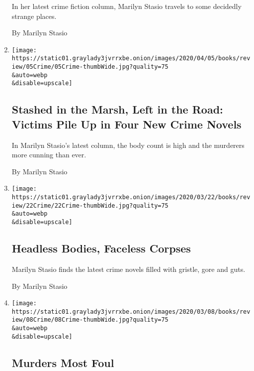 \begin{enumerate}
  In her latest crime fiction column, Marilyn Stasio travels to some
  decidedly strange places.

  By Marilyn Stasio
\item
  \href{/2020/04/03/books/review/crime-fiction-peter-swanson-eight-perfect-murders.html}{}

  \texttt{[image: https://static01.graylady3jvrrxbe.onion/images/2020/04/05/books/review/05Crime/05Crime-thumbWide.jpg?quality=75\\\&auto=webp\\\&disable=upscale]}

  \hypertarget{stashed-in-the-marsh-left-in-the-road-victims-pile-up-in-four-new-crime-novels}{%
  \subsection{Stashed in the Marsh, Left in the Road: Victims Pile Up in
  Four New Crime
  Novels}\label{stashed-in-the-marsh-left-in-the-road-victims-pile-up-in-four-new-crime-novels}}

  In Marilyn Stasio's latest column, the body count is high and the
  murderers more cunning than ever.

  By Marilyn Stasio
\item
  \href{/2020/03/20/books/review/crime-fiction-donna-leon.html}{}

  \texttt{[image: https://static01.graylady3jvrrxbe.onion/images/2020/03/22/books/review/22Crime/22Crime-thumbWide.jpg?quality=75\\\&auto=webp\\\&disable=upscale]}

  \hypertarget{headless-bodies-faceless-corpses}{%
  \subsection{Headless Bodies, Faceless
  Corpses}\label{headless-bodies-faceless-corpses}}

  Marilyn Stasio finds the latest crime novels filled with gristle, gore
  and guts.

  By Marilyn Stasio
\item
  \href{/2020/03/06/books/review/truants-kate-weinberg-new-crime-fiction.html}{}

  \texttt{[image: https://static01.graylady3jvrrxbe.onion/images/2020/03/08/books/review/08Crime/08Crime-thumbWide.jpg?quality=75\\\&auto=webp\\\&disable=upscale]}

  \hypertarget{murders-most-foul}{%
  \subsection{Murders Most Foul}\label{murders-most-foul}}


\end{enumerate}
